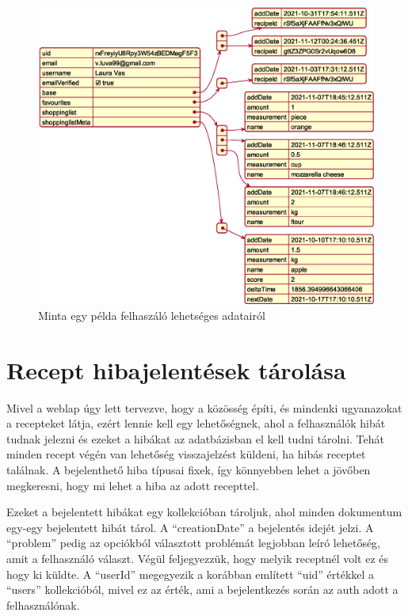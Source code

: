 \documentclass[12pt]{report}
\theoremstyle{definition}
\begin{document}
\noindent
\begin{figure}[H]
	\centering
	\includegraphics[width=\textwidth]{out/diagrams/jsonUsers/jsonUsers.eps}
	\caption{Minta egy példa felhaszáló lehetséges adatairól}
    \label{fig:jsonUsers}
\end{figure}

\section{Recept hibajelentések tárolása} 
Mivel a weblap úgy lett tervezve, hogy a közösség építi, és mindenki ugyanazokat a recepteket látja, ezért lennie kell egy lehetőségnek, ahol a felhasználók hibát tudnak jelezni és ezeket a hibákat az adatbázisban el kell tudni tárolni. Tehát minden recept végén van lehetőség visszajelzést  küldeni, ha hibás receptet találnak. A bejelenthető hiba típusai fixek, így könnyebben lehet a jövőben megkeresni, hogy mi lehet a hiba az adott recepttel. 

Ezeket a bejelentett hibákat egy kollekcióban tároljuk, ahol minden dokumentum egy-egy bejelentett hibát tárol. A “creationDate” a bejelentés idejét jelzi. A “problem” pedig az opciókból választott problémát legjobban leíró lehetőség, amit a felhasználó választ. Végül feljegyezzük, hogy melyik receptnél volt ez és hogy ki küldte. A “userId” megegyezik a korábban említett “uid” értékkel a “users” kollekcióból, mivel ez az érték, ami a bejelentkezés során az auth adott a felhasználónak.
\end{document}
